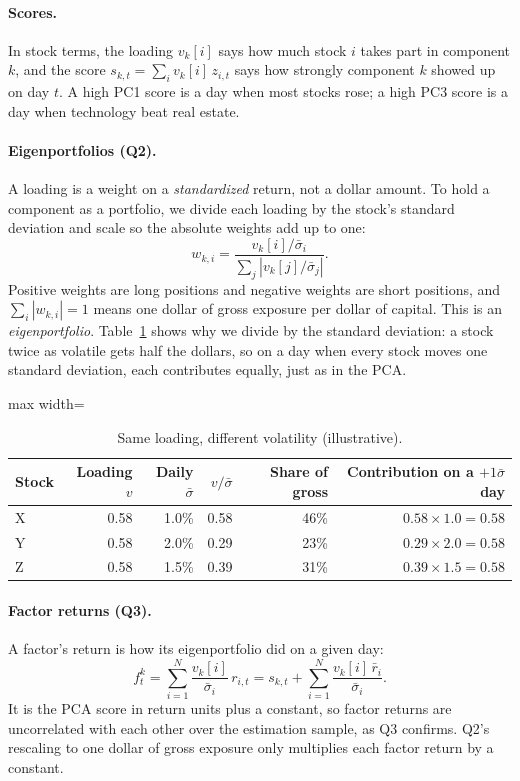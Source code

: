 \documentclass[11pt,letterpaper]{article}
\begin{document}
\paragraph{Scores.} In stock terms, the loading $v_k[i]$ says how much
stock $i$ takes part in component $k$, and the score
$s_{k,t}=\sum_i v_k[i]\,z_{i,t}$ says how strongly component $k$ showed up
on day $t$. A high PC1 score is a day when most stocks rose; a high PC3
score is a day when technology beat real estate.

\paragraph{Eigenportfolios (Q2).} A loading is a weight on a
\emph{standardized} return, not a dollar amount. To hold a component as a
portfolio, we divide each loading by the stock's standard deviation and
scale so the absolute weights add up to one:
\[
    w_{k,i}=\frac{v_k[i]/\bar\sigma_i}{\sum_{j}\left|v_k[j]/\bar\sigma_j\right|}.
\]
Positive weights are long positions and negative weights are short
positions, and $\sum_i|w_{k,i}|=1$ means one dollar of gross exposure per
dollar of capital. This is an \emph{eigenportfolio}.
Table~\ref{tab:primer-vol} shows why we divide by the standard deviation:
a stock twice as volatile gets half the dollars, so on a day when every
stock moves one standard deviation, each contributes equally, just as in
the PCA.

\begin{table}[!htbp]
    \centering
    \caption{Same loading, different volatility (illustrative).}
    \label{tab:primer-vol}
    \begin{adjustbox}{max width=\linewidth}
        \begin{tabular}{lrrrrr}
            \toprule
            Stock & Loading $v$ & Daily $\bar\sigma$ & $v/\bar\sigma$ & Share of gross & Contribution on a $+1\bar\sigma$ day \\
            \midrule
            X & 0.58 & 1.0\% & 0.58 & 46\% & $0.58\times1.0=0.58$ \\
            Y & 0.58 & 2.0\% & 0.29 & 23\% & $0.29\times2.0=0.58$ \\
            Z & 0.58 & 1.5\% & 0.39 & 31\% & $0.39\times1.5=0.58$ \\
            \bottomrule
        \end{tabular}
    \end{adjustbox}
\end{table}

\paragraph{Factor returns (Q3).} A factor's return is how its
eigenportfolio did on a given day:
\[
    f^k_t=\sum_{i=1}^{N}\frac{v_k[i]}{\bar\sigma_i}\,r_{i,t}
    =s_{k,t}+\sum_{i=1}^{N}\frac{v_k[i]\,\bar r_i}{\bar\sigma_i}.
\]
It is the PCA score in return units plus a constant, so factor returns
are uncorrelated with each other over the estimation sample, as Q3
confirms. Q2's rescaling to one dollar of gross exposure only multiplies
each factor return by a constant.
\end{document}
